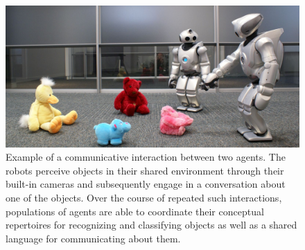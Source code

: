 \begin{figure}[t]
\includegraphics[width=\textwidth]{figures/photo-2-qrios-with-4-toys}
\caption{Example of a communicative interaction between two
  agents. The robots perceive objects in their shared environment
  through their built-in cameras and subsequently engage in a
  conversation about one of the objects. Over the course of repeated
  such interactions, populations of agents are able to coordinate
  their conceptual repertoires for recognizing and classifying objects
  as well as a shared language for communicating about them.}
\label{f:photo-2-qrios-with-4-toys}
\end{figure}

